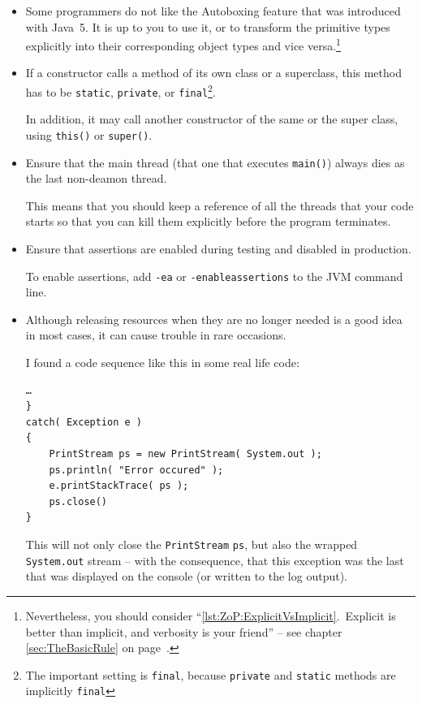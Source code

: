 \documentclass[11pt,a4paper, titlepage, parskip=half, headsepline, footsepline, cleardoublepage=current, headheight=1cm]{scrbook}
\newcommand*{\tqvref}[1]{\hyperref[{#1}]{\ref*{#1}} on page~\pageref{#1}}
\begin{document}
\begin{itemize}
\item{Some programmers do not like the Autoboxing feature that was introduced with Java~5. It is up to you to use it, or to transform the primitive types explicitly into their corresponding object types and vice versa.\footnote{Nevertheless, you should consider “\ref{lst:ZoP:ExplicitVsImplicit}.~Explicit is better than implicit, and verbosity is your friend” – see chapter \tqvref{sec:TheBasicRule}.}}

\item{If a constructor calls a method of its own class or a superclass, this method has to be \lstinline|static|, \lstinline|private|, or \lstinline|final|\footnote{The important setting is \lstinline|final|, because \lstinline|private| and \lstinline|static| methods are implicitly \lstinline|final|}.

In addition, it may call another constructor of the same or the super class, using \lstinline|this()| or \lstinline|super()|.}

\item{Ensure that the main thread (that one that executes \lstinline|main()|) always dies as the last non-deamon thread.

This means that you should keep a reference of all the threads that your code starts so that you can kill them explicitly before the program terminates.}

\item{Ensure that assertions\autocite{ORACLE_DOC_LANGUAGE_SPECIFICATION:Assert,ORACLE_DOC_ASSERTIONS} are enabled during testing and disabled in production.

To enable assertions, add \verb#-ea# or \verb#-enableassertions# to the JVM command line.}

\item{Although releasing resources when they are no longer needed is a good idea in most cases, it can cause trouble in rare occasions.

I found a code sequence like this in some real life code:
\begin{lstlisting}
…
}
catch( Exception e )
{
    PrintStream ps = new PrintStream( System.out );
    ps.println( "Error occured" );
    e.printStackTrace( ps );
    ps.close()
}
\end{lstlisting}
This will not only close the \lstinline|PrintStream| \lstinline|ps|, but also the wrapped \lstinline|System.out| stream – with the consequence, that this exception was the last that was displayed on the console (or written to the log output).

}
\end{itemize}
\end{document}

